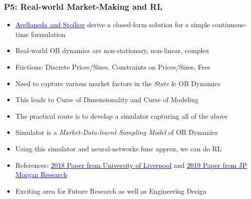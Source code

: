 \documentclass[handout]{beamer}
\begin{document}
\begin{frame}
\frametitle{P5: Real-world Market-Making and RL}
\pause
\begin{itemize}[<+->]
\item \href{https://www.math.nyu.edu/faculty/avellane/HighFrequencyTrading.pdf}{\underline{\textcolor{blue}{Avellaneda and Stoikov}}} derive a closed-form solution for a simple continuous-time formulation
\item Real-world OB dynamics are non-stationary, non-linear, complex
\item Frictions: Discrete Prices/Sizes, Constraints on Prices/Sizes, Fees
\item Need to capture various market factors in the {\em State} \& OB Dynamics
\item This leads to Curse of Dimensionality and Curse of Modeling
\item The practical route is to develop a simulator capturing all of the above
\item Simulator is a {\em Market-Data-learnt Sampling Model} of OB Dynamics 
\item Using this simulator and neural-networks func approx, we can do RL
\item References: \href{https://arxiv.org/pdf/1804.04216.pdf}{\underline{\textcolor{blue}{2018 Paper from University of Liverpool}}} and 
\href{https://arxiv.org/pdf/1911.05892.pdf}{\underline{\textcolor{blue}{2019 Paper from JP Morgan Research}}}
\item Exciting area for Future Research as well as Engineering Design
\end{itemize}
\end{frame}
\end{document}
